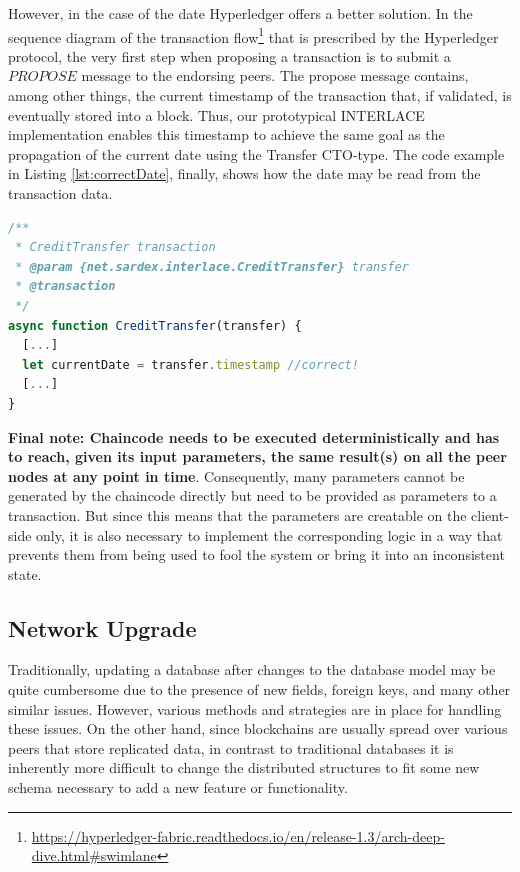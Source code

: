 However, in the case of the date Hyperledger offers a better solution. In the sequence diagram of the transaction flow\footnote{\url{https://hyperledger-fabric.readthedocs.io/en/release-1.3/arch-deep-dive.html\#swimlane}} that is prescribed by the Hyperledger protocol, the very first step when proposing a transaction is to submit a $PROPOSE$ message to the endorsing peers. The propose message contains, among other things, the current timestamp of the transaction that, if validated, is eventually stored into a block. Thus, our prototypical INTERLACE implementation enables this timestamp to achieve the same goal as the propagation of the current date using the Transfer CTO-type. The code example in Listing \ref{lst:correctDate}, finally, shows how the date may be read from the transaction data.

\begin{center}
\begin{minipage}{0.8\textwidth}
\small
\begin{lstlisting}[language=javascript,firstnumber=1,caption={\bf\small An example of chaincode with correct determination of the current date}, captionpos=b,label=lst:correctDate]
/**
 * CreditTransfer transaction
 * @param {net.sardex.interlace.CreditTransfer} transfer
 * @transaction
 */
async function CreditTransfer(transfer) {
  [...]
  let currentDate = transfer.timestamp //correct!
  [...]
}
\end{lstlisting}
\end{minipage}
\end{center}


\textbf{Final note: Chaincode needs to be executed deterministically and has to reach, given its input parameters, the same result(s) on all the peer nodes at any point in time}. Consequently, many parameters cannot be generated by the chaincode directly but need to be provided as parameters to a transaction. But since this means that the parameters are creatable on the client-side only, it is also necessary to implement the corresponding logic in a way that prevents them from being used to fool the system or bring it into an inconsistent state.

\subsection{Network Upgrade}

Traditionally, updating a database after changes to the database model may be quite cumbersome due to the presence of new fields, foreign keys, and many other similar issues. However, various methods and strategies are in place for handling these issues.
On the other hand, since blockchains are usually spread over various peers that store replicated data, in contrast to traditional databases it is inherently more difficult to change the distributed structures to fit some new schema necessary to add a new feature or functionality.

